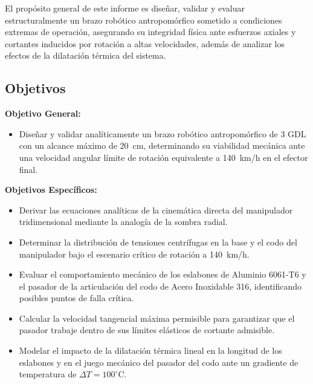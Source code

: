 \documentclass[11pt,a4paper]{article}
\begin{document}
El propósito general de este informe es diseñar, validar y evaluar estructuralmente un brazo robótico antropomórfico sometido a condiciones extremas de operación, asegurando su integridad física ante esfuerzos axiales y cortantes inducidos por rotación a altas velocidades, además de analizar los efectos de la dilatación térmica del sistema.

\subsection{Objetivos}
\textbf{Objetivo General:}
\begin{itemize}
    \item Diseñar y validar analíticamente un brazo robótico antropomórfico de 3 GDL con un alcance máximo de 20~cm, determinando su viabilidad mecánica ante una velocidad angular límite de rotación equivalente a 140~km/h en el efector final.
\end{itemize}

\textbf{Objetivos Específicos:}
\begin{itemize}
    \item Derivar las ecuaciones analíticas de la cinemática directa del manipulador tridimensional mediante la analogía de la sombra radial.
    \item Determinar la distribución de tensiones centrífugas en la base y el codo del manipulador bajo el escenario crítico de rotación a 140~km/h.
    \item Evaluar el comportamiento mecánico de los eslabones de Aluminio 6061-T6 y el pasador de la articulación del codo de Acero Inoxidable 316, identificando posibles puntos de falla crítica.
    \item Calcular la velocidad tangencial máxima permisible para garantizar que el pasador trabaje dentro de sus límites elásticos de cortante admisible.
    \item Modelar el impacto de la dilatación térmica lineal en la longitud de los eslabones y en el juego mecánico del pasador del codo ante un gradiente de temperatura de $\Delta T = 100^\circ$C.
\end{itemize}

\end{document}

